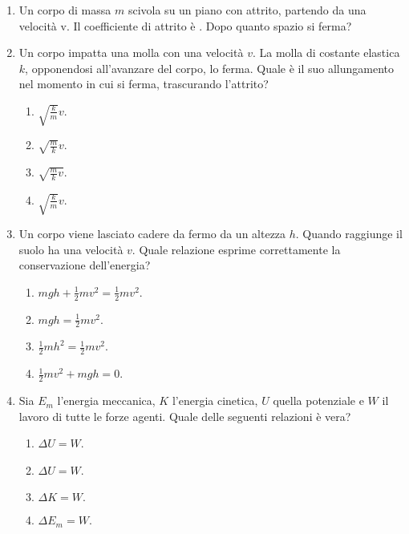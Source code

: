 \documentclass{article}
\begin{document}
\begin{enumerate}
  \item Un corpo di massa $m$ scivola su un piano con attrito, partendo da una velocità v. Il coefficiente di attrito è \mu. Dopo quanto spazio si ferma?
  \begin{enumerate}[label=\Alph*.]
    \item $\frac{v^2}{2g\mu}}$.
    \item $\frac{2v^2}{g\mu}}$.
    \item $\frac{1}{2}v^2-\mu g$.
    \item $\frac{1}{2}v^2+\mu g$.
  \end{enumerate}
  \item Un corpo impatta una molla con una velocità $v$. La molla di costante elastica $k$, opponendosi all'avanzare del corpo, lo ferma. Quale è il suo allungamento nel momento in cui si ferma, trascurando l'attrito?
  \begin{enumerate}[label=\Alph*.]
    \item $\sqrt{\frac{k}{m}}v$.
    \item $\sqrt{\frac{m}{k}}v$.
    \item $\sqrt{\frac{m}{k}v}$.
    \item $\sqrt{\frac{k}{m}}v$.
  \end{enumerate}
  \item Un corpo viene lasciato cadere da fermo da un altezza $h$. Quando raggiunge il suolo ha una velocità $v$. Quale relazione esprime correttamente la conservazione dell'energia?
  \begin{enumerate}[label=\Alph*.]
    \item $mgh+\frac{1}{2}mv^2=\frac{1}{2}mv^2.$
    \item $mgh=\frac{1}{2}mv^2$.
    \item $\frac{1}{2}mh^2=\frac{1}{2}mv^2$.
    \item $\frac{1}{2}mv^2+mgh=0.$
  \end{enumerate}
  \item Sia $E_m$ l'energia meccanica, $K$ l'energia cinetica, $U$ quella potenziale e $W$ il lavoro di tutte le forze agenti. Quale delle seguenti relazioni è vera?
  \begin{enumerate}[label=\Alph*.]
    \item $\Delta U=W$.
    \item $\Delta U=W$.
    \item $\Delta K=W.$
    \item $\Delta E_m=W$.
  \end{enumerate}

\end{enumerate}
\end{document}
